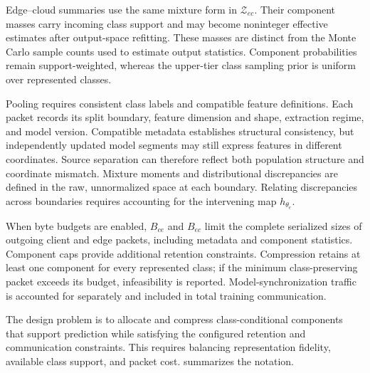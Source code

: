 Edge--cloud summaries use the same mixture form in $\mathcal Z_{ec}$. Their component masses carry incoming class support and may become noninteger effective estimates after output-space refitting. These masses are distinct from the Monte Carlo sample counts used to estimate output statistics. Component probabilities remain support-weighted, whereas the upper-tier class sampling prior is uniform over represented classes.

Pooling requires consistent class labels and compatible feature definitions. Each packet records its split boundary, feature dimension and shape, extraction regime, and model version. Compatible metadata establishes structural consistency, but independently updated model segments may still express features in different coordinates. Source separation can therefore reflect both population structure and coordinate mismatch. Mixture moments and distributional discrepancies are defined in the raw, unnormalized space at each boundary. Relating discrepancies across boundaries requires accounting for the intervening map $h_{\theta_e}$.

When byte budgets are enabled, $B_{ce}$ and $B_{ec}$ limit the complete serialized sizes of outgoing client and edge packets, including metadata and component statistics. Component caps provide additional retention constraints. Compression retains at least one component for every represented class; if the minimum class-preserving packet exceeds its budget, infeasibility is reported. Model-synchronization traffic is accounted for separately and included in total training communication.

The design problem is to allocate and compress class-conditional components that support prediction while satisfying the configured retention and communication constraints. This requires balancing representation fidelity, available class support, and packet cost.  summarizes the notation.

